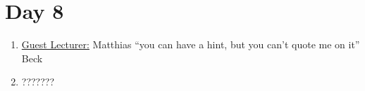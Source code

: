 \section{Day 8}
    \begin{enumerate}
        \item \underline{Guest Lecturer:} Matthias ``you can have a hint, but you can't quote me on it'' Beck
        \item ???????
    \end{enumerate}
